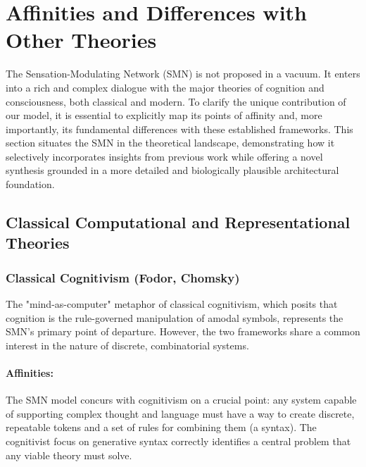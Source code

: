 \section{Affinities and Differences with Other Theories}
\label{sec:comparison}
The Sensation-Modulating Network (SMN) is not proposed in a vacuum. It enters into a rich and complex dialogue with the major theories of cognition and consciousness, both classical and modern. To clarify the unique contribution of our model, it is essential to explicitly map its points of affinity and, more importantly, its fundamental differences with these established frameworks. This section situates the SMN in the theoretical landscape, demonstrating how it selectively incorporates insights from previous work while offering a novel synthesis grounded in a more detailed and biologically plausible architectural foundation.

\subsection{Classical Computational and Representational Theories}
\label{subsec:comparison_classical}

\subsubsection{Classical Cognitivism (Fodor, Chomsky)}
\label{ssubsec:cognitivism}
The "mind-as-computer" metaphor of classical cognitivism, which posits that cognition is the rule-governed manipulation of amodal symbols, represents the SMN's primary point of departure. However, the two frameworks share a common interest in the nature of discrete, combinatorial systems.

\paragraph{Affinities:} The SMN model concurs with cognitivism on a crucial point: any system capable of supporting complex thought and language must have a way to create discrete, repeatable tokens and a set of rules for combining them (a syntax). The cognitivist focus on generative syntax correctly identifies a central problem that any viable theory must solve.

